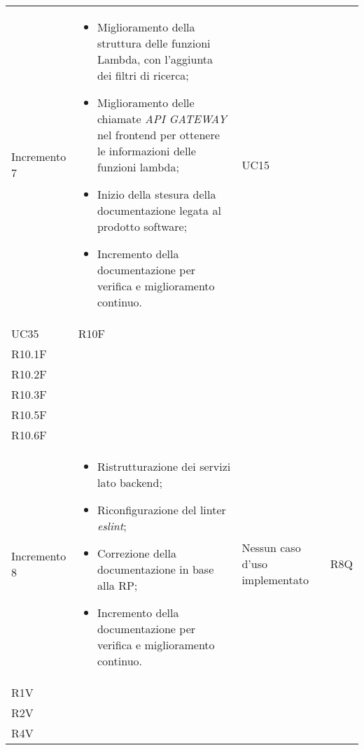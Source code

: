 \begin{longtable}{
    >{\centering}p{}
    >{\raggedright}p{}
    >{\centering}p{}
    >{\centering}p{}
    }
    Incremento 7                  &
    \vspace{-15px}
    \begin{itemize}
        \renewcommand\labelitemi{-}
        \item Miglioramento della struttura delle funzioni Lambda, con l'aggiunta dei filtri di ricerca;
        \item  Miglioramento delle chiamate \textit{API GATEWAY} nel frontend per ottenere le informazioni delle funzioni lambda;
        \item Inizio della stesura della documentazione legata al prodotto software;
        \item Incremento della documentazione per verifica e miglioramento continuo.
    \end{itemize}

                                  & UC15                                                                                                                                                                                     \\ UC35                                                                 & R10F                                                                                                       \\ R10.1F \\ R10.2F \\ R10.3F \\ R10.5F\\ R10.6F
    \tabularnewline

    Incremento 8
                                  &
    \vspace{-15px}
    \begin{itemize}
        \renewcommand\labelitemi{-}
        \item Ristrutturazione dei servizi lato backend;
        \item Riconfigurazione del linter \textit{eslint};
        \item Correzione della documentazione in base alla RP;
        \item Incremento della documentazione per verifica e miglioramento continuo.
    \end{itemize}
                                  & Nessun caso d'uso implementato                                              & R8Q                                                                                                        \\ R1V \\ R2V \\ R4V    \tabularnewline


\end{longtable}
